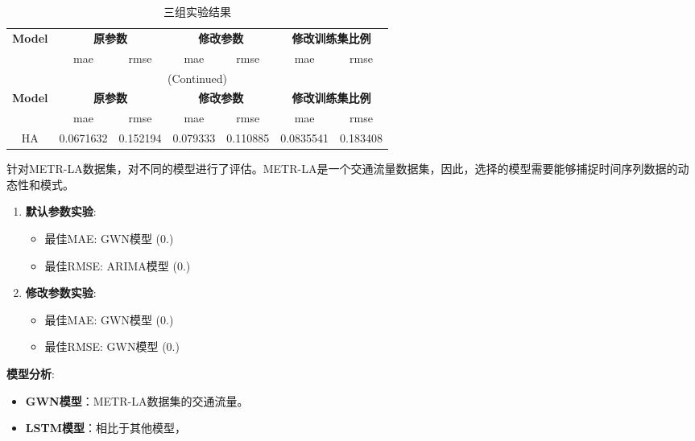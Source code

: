 \documentclass[4pt]{article}
\begin{document}
\setlength{\LTleft}{2cm}  %
\large      %
\begin{longtable}{ccccccc} %
\caption{三组实验结果} \\
\toprule
\textbf{Model} & \multicolumn{2}{c}{\textbf{原参数}} & \multicolumn{2}{c}{\textbf{修改参数}} & \multicolumn{2}{c}{\textbf{修改训练集比例}} \\
\cmidrule(r){2-3} \cmidrule(r){4-5} \cmidrule(r){6-7}
& mae & rmse & mae & rmse & mae & rmse \\
\midrule
\endfirsthead
\multicolumn{7}{c}{(Continued)} \\
\midrule
\textbf{Model} & \multicolumn{2}{c}{\textbf{原参数}} & \multicolumn{2}{c}{\textbf{修改参数}} & \multicolumn{2}{c}{\textbf{修改训练集比例}} \\
\cmidrule(r){2-3} \cmidrule(r){4-5} \cmidrule(r){6-7}
& mae & rmse & mae & rmse & mae & rmse \\
\midrule
\endhead
\bottomrule
\endlastfoot
HA & 0.0671632 & 0.152194 & 0.079333 & 0.110885 & 0.0835541 & 0.183408 \\
\end{longtable}


针对METR-LA数据集，对不同的模型进行了评估。METR-LA是一个交通流量数据集，因此，选择的模型需要能够捕捉时间序列数据的动态性和模式。

\begin{enumerate}
  \item \textbf{默认参数实验}:
    \begin{itemize}
      \item 最佳MAE: GWN模型 (0.)
      \item 最佳RMSE: ARIMA模型 (0.)
    \end{itemize}

  \item \textbf{修改参数实验}:
    \begin{itemize}
      \item 最佳MAE: GWN模型 (0.)
      \item 最佳RMSE: GWN模型 (0.)
    \end{itemize}

\end{enumerate}

\textbf{模型分析}:
\begin{itemize}
  \item \textbf{GWN模型}：METR-LA数据集的交通流量。

  \item \textbf{LSTM模型}：相比于其他模型，
\end{itemize}
\end{document}

